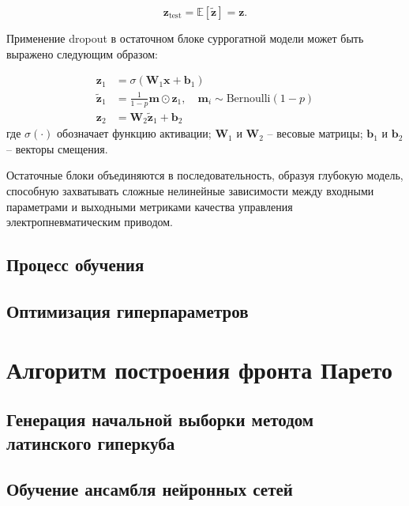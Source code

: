 \begin{equation}
    \mathbf{z}_{\text{test}} = \mathbb{E}[\tilde{\mathbf{z}}] = \mathbf{z}.
\end{equation}

Применение dropout в остаточном блоке суррогатной модели может быть выражено следующим образом:

\begin{equation*}
    \begin{split}
        \mathbf{z}_1         & = \sigma(\mathbf{W}_1\mathbf{x} + \mathbf{b}_1)                                             \\
        \tilde{\mathbf{z}}_1 & = \frac{1}{1-p}\mathbf{m} \odot \mathbf{z}_1, \quad \mathbf{m}_i \sim \text{Bernoulli}(1-p) \\
        \mathbf{z}_2         & = \mathbf{W}_2\tilde{\mathbf{z}}_1 + \mathbf{b}_2
    \end{split}
\end{equation*}
где $\sigma(\cdot)$ обозначает функцию активации;
$\mathbf{W}_1$ и $\mathbf{W}_2$ -- весовые матрицы;
$\mathbf{b}_1$ и $\mathbf{b}_2$ -- векторы смещения.

Остаточные блоки объединяются в последовательность, образуя глубокую модель, способную
захватывать сложные нелинейные зависимости между входными параметрами и выходными метриками
качества управления электропневматическим приводом.

\subsection{Процесс обучения}\label{sec:ch4/sec3/subsec2}
\subsection{Оптимизация гиперпараметров}\label{sec:ch4/sec3/subsec3}

\section{Алгоритм построения фронта Парето}\label{sec:ch4/sec4}
\subsection{Генерация начальной выборки методом латинского гиперкуба}\label{sec:ch4/sec4/subsec1}
\subsection{Обучение ансамбля нейронных сетей}\label{sec:ch4/sec4/subsec2}
